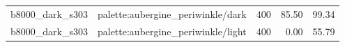 \begin{longtable}{l>{\raggedright\arraybackslash}p{.42\linewidth}rrr}
b8000\_\allowbreak{}dark\_\allowbreak{}s303 & %
palette:aubergine\_\allowbreak{}periwinkle/dark & %
400 & %
85.50 & %
99.34 \\ %

b8000\_\allowbreak{}dark\_\allowbreak{}s303 & %
palette:aubergine\_\allowbreak{}periwinkle/light & %
400 & %
0.00 & %
55.79 \\ %


\end{longtable}
